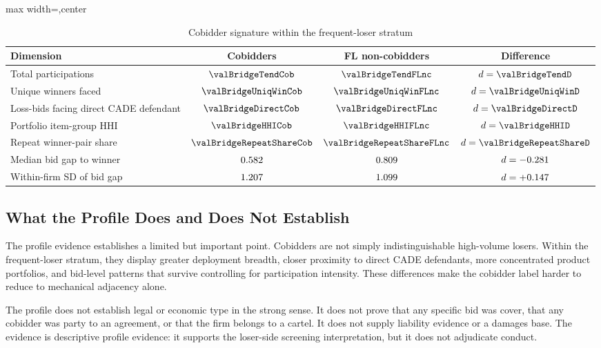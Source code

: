 \begin{table}[htbp]
\centering
\caption{Cobidder signature within the frequent-loser stratum}
\label{tab:cobidder_signature_v18}
\footnotesize
\begin{adjustbox}{max width=\textwidth,center}
\begin{tabular}{p{4.4cm}ccc}
\toprule
Dimension & Cobidders & FL non-cobidders & Difference \\
\midrule
Total participations & $\valBridgeTendCob$ & $\valBridgeTendFLnc$ & $d=\valBridgeTendD$ \\
Unique winners faced & $\valBridgeUniqWinCob$ & $\valBridgeUniqWinFLnc$ & $d=\valBridgeUniqWinD$ \\
Loss-bids facing direct CADE defendant & $\valBridgeDirectCob$ & $\valBridgeDirectFLnc$ & $d=\valBridgeDirectD$ \\
Portfolio item-group HHI & $\valBridgeHHICob$ & $\valBridgeHHIFLnc$ & $d=\valBridgeHHID$ \\
Repeat winner-pair share & $\valBridgeRepeatShareCob$ & $\valBridgeRepeatShareFLnc$ & $d=\valBridgeRepeatShareD$ \\
\midrule
Median bid gap to winner & $0.582$ & $0.809$ & $d=-0.281$ \\
Within-firm SD of bid gap & $1.207$ & $1.099$ & $d=+0.147$ \\
\bottomrule
\end{tabular}
\end{adjustbox}
\end{table}

\subsection{What the Profile Does and Does Not Establish}
\label{sec:cobidder_interpretation}

The profile evidence establishes a limited but important point.
Cobidders are not simply indistinguishable high-volume losers.
Within the frequent-loser stratum, they display greater
deployment breadth, closer proximity to direct CADE defendants,
more concentrated product portfolios, and bid-level patterns
that survive controlling for participation intensity. These
differences make the cobidder label harder to reduce to
mechanical adjacency alone.

The profile does not establish legal or economic type in the
strong sense. It does not prove that any specific bid was
cover, that any cobidder was party to an agreement, or that the
firm belongs to a cartel. It does not supply liability evidence
or a damages base. The evidence is descriptive profile
evidence: it supports the loser-side screening interpretation,
but it does not adjudicate conduct.

